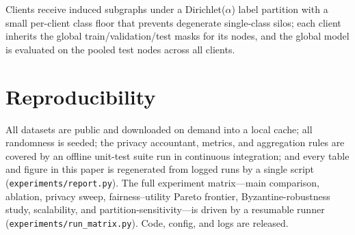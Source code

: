 \documentclass[pdflatex,sn-mathphys-num]{sn-jnl}
\theoremstyle{thmstyleone}%
\theoremstyle{thmstyletwo}%
\theoremstyle{thmstylethree}%
\begin{document}
\begin{appendices}
Clients receive induced subgraphs under a Dirichlet($\alpha$) label partition
with a small per-client class floor that prevents degenerate single-class silos;
each client inherits the global train/validation/test masks for its nodes, and
the global model is evaluated on the pooled test nodes across all clients.

\section{Reproducibility}
\label{app:repro}
All datasets are public and downloaded on demand into a local cache; all
randomness is seeded; the privacy accountant, metrics, and aggregation rules are
covered by an offline unit-test suite run in continuous integration; and every
table and figure in this paper is regenerated from logged runs by a single
script (\texttt{experiments/report.py}). The full experiment matrix---main
comparison, ablation, privacy sweep, fairness--utility Pareto frontier,
Byzantine-robustness study, scalability, and partition-sensitivity---is driven
by a resumable runner (\texttt{experiments/run\_matrix.py}). Code, config, and
logs are released.

\end{appendices}


\end{document}
